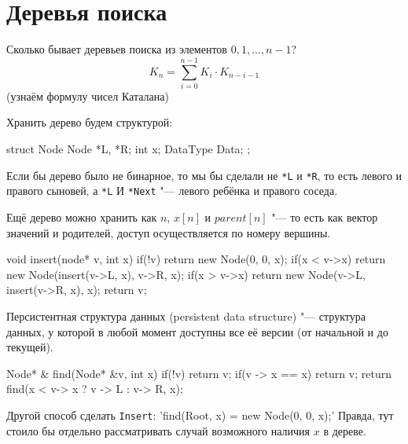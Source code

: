 \chapter{Деревья поиска}
Сколько бывает деревьев поиска из элементов $0, 1, \ldots, n - 1$?
\[ K_{n} = \sum_{i = 0}^{n -1} K_{i} \cdot K_{n - i - 1} \]
(узнаём формулу чисел Каталана)

Хранить дерево будем структурой:
\begin{cppcode}
struct Node {
	Node *L, *R;
	int x;
	DataType Data;
};
\end{cppcode}

\begin{Rem}
	Если бы дерево было не бинарное, то мы бы сделали не \texttt{*L} и \texttt{*R}, 
	то есть левого и правого сыновей, а \texttt{*L} И \texttt{*Next} "--- 
	левого ребёнка  и правого соседа.
\end{Rem}

\begin{Rem}
	Ещё дерево можно хранить как $n$, $x[n]$ и $parent[n]$ "--- то есть 
	как вектор значений и родителей, доступ осуществляется по номеру вершины.
\end{Rem}

\begin{cppcode}
void insert(node* v, int x) {
	if(!v)
		return new Node(0, 0, x);
	 if(x < v->x)
		return new Node(insert(v->L, x), v->R, x);
	if(x > v->x)
		return new Node(v->L, insert(v->R, x), x);
	return v;
}
\end{cppcode}

\begin{Def}
	Персистентная структура данных (persistent data structure) "--- 
	структура данных, у которой в любой момент доступны все её версии 
	(от начальной и до текущей).
\end{Def}

\begin{cppcode}
Node* & find(Node* &v, int x) {
	if(!v)
		return v;
	if(v -> x == x)
		return v;
	return find(x < v-> x ? v -> L : v-> R, x);
}
\end{cppcode}

\begin{Rem}
	Другой способ сделать \texttt{Insert}: \cpp'find(Root, x) = new Node(0, 0, x);'
	Правда, тут стоило бы отдельно рассматривать случай возможного наличия $x$ в дереве.
\end{Rem}

